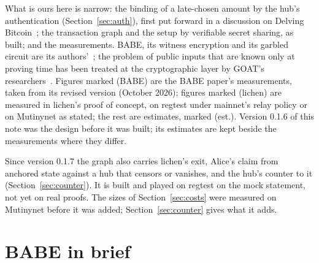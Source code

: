 \documentclass[11pt]{article}
\begin{document}
What is ours here is narrow: the binding of a late-chosen amount by the
hub's authentication (Section~\ref{sec:auth}), first put forward in a
discussion on Delving Bitcoin~\cite{delving}; the transaction graph and
the setup by verifiable secret sharing, as built; and the measurements.
BABE, its witness encryption and its garbled circuit are its
authors'~\cite{babe,gkpw24,argo}; the problem of public inputs that are
known only at proving time has been treated at the cryptographic layer by
GOAT's researchers~\cite{goat}. Figures marked (BABE) are the BABE
paper's measurements, taken from its revised version (October 2026);
figures marked (lichen) are measured in lichen's proof of concept, on
regtest under mainnet's relay policy or on Mutinynet as stated; the rest
are estimates, marked (est.). Version 0.1.6 of this note was the design
before it was built; its estimates are kept beside the measurements where
they differ.

Since version 0.1.7 the graph also carries lichen's exit, Alice's claim
from anchored state against a hub that censors or vanishes, and the
hub's counter to it (Section~\ref{sec:counter}). It is built and played
on regtest on the mock statement, not yet on real proofs. The sizes of
Section~\ref{sec:costs} were measured on Mutinynet before it was added;
Section~\ref{sec:counter} gives what it adds.

\section{BABE in brief}
\label{sec:babe}
\end{document}

